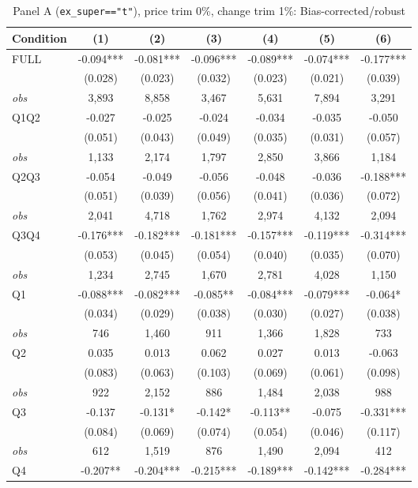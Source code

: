 \documentclass[11pt]{article}
\begin{document}
\begin{table}[!htbp]
\centering
\caption{Panel A (\texttt{ex\_super=="t"}), price trim 0\%, change trim 1\%: Bias-corrected/robust}
\label{tab:a:trim01:robust}
\small
\begin{tabular}{lcccccc}
\toprule
Condition & (1) & (2) & (3) & (4) & (5) & (6) \\
\midrule
FULL & -0.094*** & -0.081*** & -0.096*** & -0.089*** & -0.074*** & -0.177*** \\
 & (0.028) & (0.023) & (0.032) & (0.023) & (0.021) & (0.039) \\
\textit{obs} & 3,893 & 8,858 & 3,467 & 5,631 & 7,894 & 3,291 \\
Q1Q2 & -0.027 & -0.025 & -0.024 & -0.034 & -0.035 & -0.050 \\
 & (0.051) & (0.043) & (0.049) & (0.035) & (0.031) & (0.057) \\
\textit{obs} & 1,133 & 2,174 & 1,797 & 2,850 & 3,866 & 1,184 \\
Q2Q3 & -0.054 & -0.049 & -0.056 & -0.048 & -0.036 & -0.188*** \\
 & (0.051) & (0.039) & (0.056) & (0.041) & (0.036) & (0.072) \\
\textit{obs} & 2,041 & 4,718 & 1,762 & 2,974 & 4,132 & 2,094 \\
Q3Q4 & -0.176*** & -0.182*** & -0.181*** & -0.157*** & -0.119*** & -0.314*** \\
 & (0.053) & (0.045) & (0.054) & (0.040) & (0.035) & (0.070) \\
\textit{obs} & 1,234 & 2,745 & 1,670 & 2,781 & 4,028 & 1,150 \\
Q1 & -0.088*** & -0.082*** & -0.085** & -0.084*** & -0.079*** & -0.064* \\
 & (0.034) & (0.029) & (0.038) & (0.030) & (0.027) & (0.038) \\
\textit{obs} &   746 & 1,460 &   911 & 1,366 & 1,828 &   733 \\
Q2 & 0.035 & 0.013 & 0.062 & 0.027 & 0.013 & -0.063 \\
 & (0.083) & (0.063) & (0.103) & (0.069) & (0.061) & (0.098) \\
\textit{obs} &   922 & 2,152 &   886 & 1,484 & 2,038 &   988 \\
Q3 & -0.137 & -0.131* & -0.142* & -0.113** & -0.075 & -0.331*** \\
 & (0.084) & (0.069) & (0.074) & (0.054) & (0.046) & (0.117) \\
\textit{obs} &   612 & 1,519 &   876 & 1,490 & 2,094 &   412 \\
Q4 & -0.207** & -0.204*** & -0.215*** & -0.189*** & -0.142*** & -0.284*** \\

\end{tabular}
\end{table}
\end{document}
